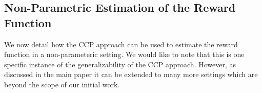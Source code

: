 \documentclass{article}
\begin{document}
\begin{appendix}
\section{Non-Parametric Estimation of the Reward Function}

We now detail how the CCP approach can be used to estimate the reward function in a non-parameteric setting. We would like to note that this is one specific instance of the generalizability of the CCP approach. However, as discussed in the main paper it can be extended to many more settings which are beyond the scope of our initial work.


\end{appendix}
\end{document}
